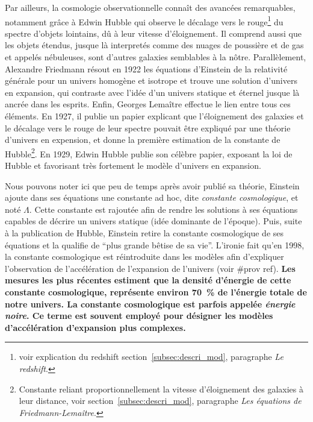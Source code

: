 \documentclass[11pt, twoside, a4paper, openright]{report}
\begin{document}
Par ailleurs, la cosmologie observationnelle connaît des avancées remarquables, notamment grâce à Edwin Hubble qui observe le décalage vers le rouge\footnote{voir explication du redshift section~\ref{subsec:descri_mod}, paragraphe \emph{Le redshift}.} du spectre d'objets lointains, dû à leur vitesse d'éloignement. Il comprend aussi que les objets étendus, jusque là interpretés comme des nuages de poussière et de gas et appelés nébuleuses, sont d'autres galaxies semblables à la nôtre. Parallèlement, Alexandre Friedmann résout en 1922 les équations d'Einstein de la relativité générale pour un univers homogène et isotrope et trouve une solution d'univers en expansion, qui contraste avec l'idée d'un univers statique et éternel jusque là ancrée dans les esprits. Enfin, Georges Lemaître effectue le lien entre tous ces éléments. En 1927, il publie un papier explicant que l'éloignement des galaxies et le décalage vers le rouge de leur spectre pouvait être expliqué par une théorie d'univers en expension, et donne la première estimation de la constante de Hubble\footnote{Constante reliant proportionnellement la vitesse d'éloignement des galaxies à leur distance, voir section~\ref{subsec:descri_mod}, paragraphe \emph{Les équations de Friedmann-Lemaître}.}. En 1929, Edwin Hubble publie son célèbre papier, exposant la loi de Hubble et favorisant très fortement le modèle d'univers en expansion.

Nous pouvons noter ici que peu de temps après avoir publié sa théorie, Einstein ajoute dans ses équations une constante ad hoc, dite \emph{constante cosmologique}, et noté $\Lambda$. Cette constante est rajoutée afin de rendre les solutions à ses équations capables de décrire un univers statique (idée dominante de l'époque). Puis, suite à la publication de Hubble, Einstein retire la constante cosmologique de ses équations et la qualifie de ``plus grande bêtise de sa vie''. L'ironie fait qu'en 1998, la constante cosmologique est réintroduite dans les modèles afin d'expliquer l'observation de l'accélération de l'expansion de l'univers (voir \#prov ref). \textbf{Les mesures les plus récentes estiment que la densité d'énergie de cette constante cosmologique, représente environ \SI{70}{\percent} de l'énergie totale de notre univers. La constante cosmologique est parfois appelée \emph{énergie noire}. Ce terme est souvent employé pour désigner les modèles d'accélération d'expansion plus complexes.}
\end{document}
